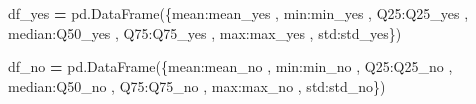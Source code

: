 \documentclass[
  11pt,
  a4paper,
]{article}
\newenvironment{Shaded}{\begin{snugshade}}{\end{snugshade}}
\newcommand{\NormalTok}[1]{#1}
\newcommand{\OperatorTok}[1]{\textcolor[rgb]{0.81,0.36,0.00}{\textbf{#1}}}
\newcommand{\StringTok}[1]{\textcolor[rgb]{0.31,0.60,0.02}{#1}}
\begin{document}
\begin{Shaded}
\begin{Highlighting}[]
\NormalTok{df\_yes }\OperatorTok{=}\NormalTok{ pd.DataFrame(\{}\StringTok{\textquotesingle{}mean\textquotesingle{}}\NormalTok{:mean\_yes , }\StringTok{\textquotesingle{}min\textquotesingle{}}\NormalTok{:min\_yes , }\StringTok{\textquotesingle{}Q25\textquotesingle{}}\NormalTok{:Q25\_yes  , }\StringTok{\textquotesingle{}median\textquotesingle{}}\NormalTok{:Q50\_yes  , }\StringTok{\textquotesingle{}Q75\textquotesingle{}}\NormalTok{:Q75\_yes  , }\StringTok{\textquotesingle{}max\textquotesingle{}}\NormalTok{:max\_yes  , }\StringTok{\textquotesingle{}std\textquotesingle{}}\NormalTok{:std\_yes\})}

\NormalTok{df\_no }\OperatorTok{=}\NormalTok{ pd.DataFrame(\{}\StringTok{\textquotesingle{}mean\textquotesingle{}}\NormalTok{:mean\_no , }\StringTok{\textquotesingle{}min\textquotesingle{}}\NormalTok{:min\_no , }\StringTok{\textquotesingle{}Q25\textquotesingle{}}\NormalTok{:Q25\_no  , }\StringTok{\textquotesingle{}median\textquotesingle{}}\NormalTok{:Q50\_no  , }\StringTok{\textquotesingle{}Q75\textquotesingle{}}\NormalTok{:Q75\_no  , }\StringTok{\textquotesingle{}max\textquotesingle{}}\NormalTok{:max\_no  , }\StringTok{\textquotesingle{}std\textquotesingle{}}\NormalTok{:std\_no\})}
\end{Highlighting}
\end{Shaded}
\end{document}
